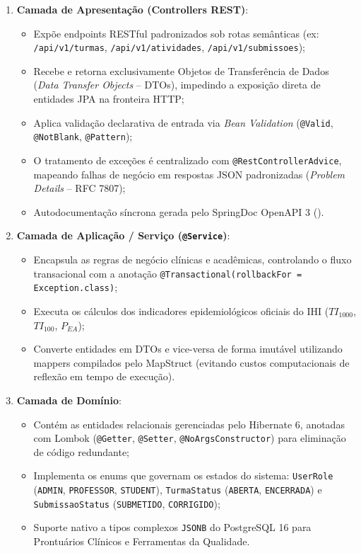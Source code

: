 \begin{enumerate}
    \item \textbf{Camada de Apresentação (Controllers REST)}:
    \begin{itemize}
        \item Expõe endpoints RESTful padronizados sob rotas semânticas (ex: \texttt{/api/v1/turmas}, \texttt{/api/v1/atividades}, \texttt{/api/v1/submissoes});
        \item Recebe e retorna exclusivamente Objetos de Transferência de Dados (\textit{Data Transfer Objects} -- DTOs), impedindo a exposição direta de entidades JPA na fronteira HTTP;
        \item Aplica validação declarativa de entrada via \textit{Bean Validation} (\texttt{@Valid}, \texttt{@NotBlank}, \texttt{@Pattern});
        \item O tratamento de exceções é centralizado com \texttt{@RestControllerAdvice}, mapeando falhas de negócio em respostas JSON padronizadas (\textit{Problem Details} -- RFC 7807);
        \item Autodocumentação síncrona gerada pelo SpringDoc OpenAPI 3 ().
    \end{itemize}

    \item \textbf{Camada de Aplicação / Serviço (\texttt{@Service})}:
    \begin{itemize}
        \item Encapsula as regras de negócio clínicas e acadêmicas, controlando o fluxo transacional com a anotação \texttt{@Transactional(rollbackFor = Exception.class)};
        \item Executa os cálculos dos indicadores epidemiológicos oficiais do IHI ($TI_{1000}$, $TI_{100}$, $P_{EA}$);
        \item Converte entidades em DTOs e vice-versa de forma imutável utilizando mappers compilados pelo MapStruct (evitando custos computacionais de reflexão em tempo de execução).
    \end{itemize}

    \item \textbf{Camada de Domínio}:
    \begin{itemize}
        \item Contém as entidades relacionais gerenciadas pelo Hibernate 6, anotadas com Lombok (\texttt{@Getter}, \texttt{@Setter}, \texttt{@NoArgsConstructor}) para eliminação de código redundante;
        \item Implementa os enums que governam os estados do sistema: \texttt{UserRole} (\texttt{ADMIN}, \texttt{PROFESSOR}, \texttt{STUDENT}), \texttt{TurmaStatus} (\texttt{ABERTA}, \texttt{ENCERRADA}) e \texttt{SubmissaoStatus} (\texttt{SUBMETIDO}, \texttt{CORRIGIDO});
        \item Suporte nativo a tipos complexos \texttt{JSONB} do PostgreSQL 16 para Prontuários Clínicos e Ferramentas da Qualidade.
    \end{itemize}


\end{enumerate}
